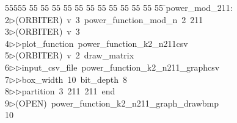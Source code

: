 %
%
\begin{tabbing}
55555 \= 55 \= 55 \= 55 \= 55 \= 55 \= 55 \= 55 \= 55 \= 55 \= 55 \= 55 \= 55 \= \>power\_mod\_211:\\[0pt]
2\>$\triangleright$\>(ORBITER)\ v\ 3\ power\_function\_mod\_n\ 2\ 211\\[0pt]
3\>$\triangleright$\>(ORBITER)\ v\ 3\ \\[0pt]
4\>$\triangleright$\>$\triangleright$\>plot\_function\ power\_function\_k2\_n211csv\\[0pt]
5\>$\triangleright$\>(ORBITER)\ v\ 2\ draw\_matrix\ \\[0pt]
6\>$\triangleright$\>$\triangleright$\>input\_csv\_file\ power\_function\_k2\_n211\_graphcsv\ \\[0pt]
7\>$\triangleright$\>$\triangleright$\>box\_width\ 10\ bit\_depth\ 8\ \\[0pt]
8\>$\triangleright$\>$\triangleright$\>partition\ 3\ 211\ 211\ end\\[0pt]
9\>$\triangleright$\>(OPEN)\ power\_function\_k2\_n211\_graph\_drawbmp\\[0pt]
10\>\end{tabbing}
